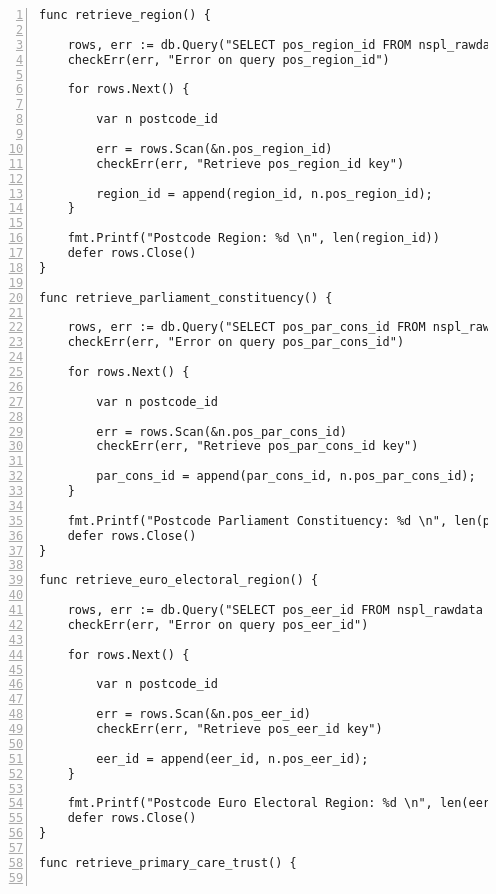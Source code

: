 \begin{lstlisting}[breaklines, frame=single, numbers=left, caption={Resource Table Key Retrieval Function.}, label=commandline-02]
func retrieve_region() {

	rows, err := db.Query("SELECT pos_region_id FROM nspl_rawdata AS rawdata JOIN postcode_region AS region ON region.pos_region_code = rawdata.region_code AND region.pos_region_name = rawdata.region_name;" )
	checkErr(err, "Error on query pos_region_id")	 
	
	for rows.Next() {
	
		var n postcode_id
		
		err = rows.Scan(&n.pos_region_id)
		checkErr(err, "Retrieve pos_region_id key")
		
		region_id = append(region_id, n.pos_region_id); 
	}
	
	fmt.Printf("Postcode Region: %d \n", len(region_id))
	defer rows.Close()
}

func retrieve_parliament_constituency() {

	rows, err := db.Query("SELECT pos_par_cons_id FROM nspl_rawdata AS rawdata JOIN postcode_parliament_constituency AS ppc ON ppc.pos_par_cons_code = rawdata.par_cons_code AND ppc.pos_par_cons_name = rawdata.par_cons_name;" )
	checkErr(err, "Error on query pos_par_cons_id")	 
	
	for rows.Next() {
	
		var n postcode_id
		
		err = rows.Scan(&n.pos_par_cons_id)
		checkErr(err, "Retrieve pos_par_cons_id key")
		
		par_cons_id = append(par_cons_id, n.pos_par_cons_id); 
	}
	
	fmt.Printf("Postcode Parliament Constituency: %d \n", len(par_cons_id))
	defer rows.Close()
}

func retrieve_euro_electoral_region() {

	rows, err := db.Query("SELECT pos_eer_id FROM nspl_rawdata AS rawdata JOIN postcode_euro_electoral_region AS eer ON eer.pos_eer_code = rawdata.eerc AND eer.pos_eer_name = rawdata.eern;" )
	checkErr(err, "Error on query pos_eer_id")	 
	
	for rows.Next() {
	
		var n postcode_id
		
		err = rows.Scan(&n.pos_eer_id)
		checkErr(err, "Retrieve pos_eer_id key")
		
		eer_id = append(eer_id, n.pos_eer_id); 
	}

	fmt.Printf("Postcode Euro Electoral Region: %d \n", len(eer_id))
	defer rows.Close()
}

func retrieve_primary_care_trust() {


\end{lstlisting}

